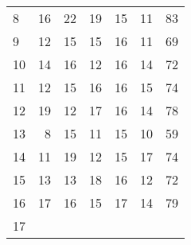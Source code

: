 \documentclass{article}
\begin{document}
\begin{table}[!h]
\begin{tabular}{lllllll}
\multicolumn{1}{l}{\hspace{1em}8} &
  \multicolumn{1}{|r}{16} &
  \multicolumn{1}{r}{22} &
  \multicolumn{1}{r}{19} &
  \multicolumn{1}{r}{15} &
  \multicolumn{1}{r}{11} &
  \multicolumn{1}{r}{83} \\
\multicolumn{1}{l}{\hspace{1em}9} &
  \multicolumn{1}{|r}{12} &
  \multicolumn{1}{r}{15} &
  \multicolumn{1}{r}{15} &
  \multicolumn{1}{r}{16} &
  \multicolumn{1}{r}{11} &
  \multicolumn{1}{r}{69} \\
\multicolumn{1}{l}{\hspace{1em}10} &
  \multicolumn{1}{|r}{14} &
  \multicolumn{1}{r}{16} &
  \multicolumn{1}{r}{12} &
  \multicolumn{1}{r}{16} &
  \multicolumn{1}{r}{14} &
  \multicolumn{1}{r}{72} \\
\multicolumn{1}{l}{\hspace{1em}11} &
  \multicolumn{1}{|r}{12} &
  \multicolumn{1}{r}{15} &
  \multicolumn{1}{r}{16} &
  \multicolumn{1}{r}{16} &
  \multicolumn{1}{r}{15} &
  \multicolumn{1}{r}{74} \\
\multicolumn{1}{l}{\hspace{1em}12} &
  \multicolumn{1}{|r}{19} &
  \multicolumn{1}{r}{12} &
  \multicolumn{1}{r}{17} &
  \multicolumn{1}{r}{16} &
  \multicolumn{1}{r}{14} &
  \multicolumn{1}{r}{78} \\
\multicolumn{1}{l}{\hspace{1em}13} &
  \multicolumn{1}{|r}{8} &
  \multicolumn{1}{r}{15} &
  \multicolumn{1}{r}{11} &
  \multicolumn{1}{r}{15} &
  \multicolumn{1}{r}{10} &
  \multicolumn{1}{r}{59} \\
\multicolumn{1}{l}{\hspace{1em}14} &
  \multicolumn{1}{|r}{11} &
  \multicolumn{1}{r}{19} &
  \multicolumn{1}{r}{12} &
  \multicolumn{1}{r}{15} &
  \multicolumn{1}{r}{17} &
  \multicolumn{1}{r}{74} \\
\multicolumn{1}{l}{\hspace{1em}15} &
  \multicolumn{1}{|r}{13} &
  \multicolumn{1}{r}{13} &
  \multicolumn{1}{r}{18} &
  \multicolumn{1}{r}{16} &
  \multicolumn{1}{r}{12} &
  \multicolumn{1}{r}{72} \\
\multicolumn{1}{l}{\hspace{1em}16} &
  \multicolumn{1}{|r}{17} &
  \multicolumn{1}{r}{16} &
  \multicolumn{1}{r}{15} &
  \multicolumn{1}{r}{17} &
  \multicolumn{1}{r}{14} &
  \multicolumn{1}{r}{79} \\
\multicolumn{1}{l}{\hspace{1em}17} &

\end{tabular}
\end{table}
\end{document}
